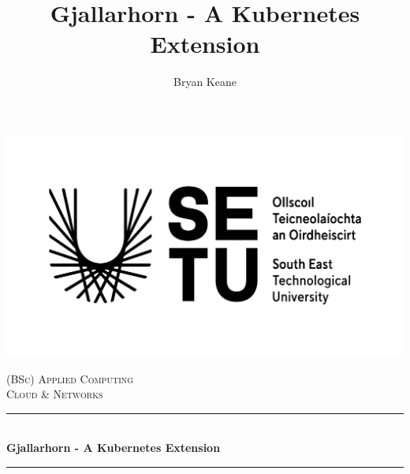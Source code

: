 \documentclass{article}
\title{Gjallarhorn - A Kubernetes Extension}
\author{Bryan Keane}
\begin{document}
\begin{titlepage}

    \newcommand{\HRule}{\rule{\linewidth}{0.5mm}} 
    \center
    
    
    \begin{center}
        \includegraphics{setu_logo.png}
    \end{center}
     
    
     
    \textsc{\LARGE (BSc) Applied Computing}\\[0.25cm]
    \textsc{\Large Cloud \& Networks}\\[0.25cm] 
    
    
    
    \HRule \\[0.75cm]
    { \huge \bfseries Gjallarhorn - A Kubernetes Extension}\\[0.3cm] %
    \HRule \\[1.0cm]
     
    

\end{titlepage}
\end{document}
